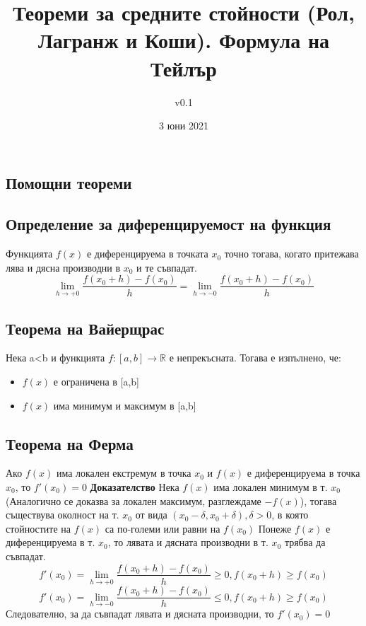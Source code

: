 \documentclass[fleqn,12pt]{article}
\title{Теореми  за  средните  стойности  (Рол,  Лагранж  и  Коши).  Формула  на Тейлър}
\author{v0.1}
\date{3 юни 2021}
\begin{document}
    
\maketitle

\tableofcontents

\begin{flushleft}
    
\section{Помощни теореми}

\subsection{Определение за диференцируемост на функция}
Функцията $f(x)$ е диференцируема в точката $x_0$ точно тогава, когато притежава лява и дясна производни в $x_0$ и те съвпадат.
\[\lim_{h \to +0} \frac{f(x_0 + h)-f(x_0)}{h} = \lim_{h \to -0} \frac{ f(x_0 + h)-f(x_0)}{h}\]

\subsection{Теорема на Вайерщрас}
Нека a<b и функцията $f:[a,b]\rightarrow\mathbb{R}$ е непрекъсната. Тогава е изпълнено, че:
\begin{itemize}
    \item $f(x)$ е ограничена в [a,b]
    \item $f(x)$ има минимум и максимум в [a,b] 
\end{itemize}

\subsection{Теорема на Ферма}
Ако $f(x)$ има локален екстремум в точка $x_0$ и $f(x)$ е диференцируема в точка $x_0$, то $f'(x_0)=0$
\bigbreak
\textbf{Доказателство}
Нека $f(x)$ има локален минимум в т. $x_0$ (Аналогично се доказва за локален максимум, разглеждаме $-f(x)$),
тогава съществува околност на т. $x_0$ от вида $(x_0 - \delta,x_0 + \delta), \delta > 0$, в която стойностите на $f(x)$ са по-големи или равни на $f(x_0)$
Понеже $f(x)$ е диференцируема в т. $x_0$, то лявата и дясната производни в т. $x_0$ трябва да съвпадат.
\[f'(x_0) = \lim_{h \to +0} \frac{ f(x_0 + h)-f(x_0)}{h} \geq 0, f(x_0 + h) \geq f(x_0)\]
\[f'(x_0) = \lim_{h \to -0} \frac{ f(x_0 + h)-f(x_0)}{h} \leq 0, f(x_0 + h) \geq f(x_0)\]
Следователно, за да съвпадат лявата и дясната производни, то $f'(x_0) = 0$


\end{flushleft}
\end{document}
